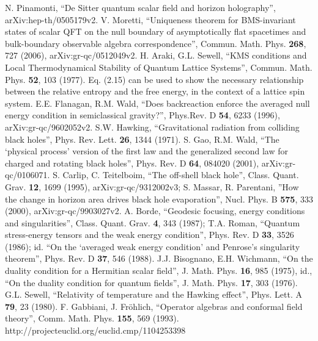 \documentclass{article}
\begin{document}
\begin{thebibliography}{299}
N. Pinamonti, ``De Sitter quantum scalar field and horizon holography'', arXiv:hep-th/0505179v2.
V. Moretti, ``Uniqueness theorem for BMS-invariant states of scalar QFT on the null boundary of asymptotically flat spacetimes and bulk-boundary observable algebra correspondence'', Commun. Math. Phys. \textbf{268}, 727 (2006), arXiv:gr-qc/0512049v2.
H. Araki, G.L. Sewell, ``KMS conditions and Local Thermodynamical Stability of Quantum Lattice Systems'', Commun. Math. Phys. \textbf{52}, 103 (1977).  Eq. (2.15) can be used to show the necessary relationship between the relative entropy and the free energy, in the context of a lattice spin system.
E.E. Flanagan, R.M. Wald, ``Does backreaction enforce the averaged null energy condition in semiclassical gravity?'', Phys.Rev. D \textbf{54}, 6233 (1996), arXiv:gr-qc/9602052v2.
S.W. Hawking, ``Gravitational radiation from colliding black holes'', Phys. Rev. Lett. \textbf{26}, 1344 (1971).
S. Gao, R.M. Wald, ``The `physical process' version of the first law and the generalized second law for charged and rotating black holes'', Phys. Rev. D \textbf{64}, 084020 (2001), arXiv:gr-qc/0106071.
S. Carlip, C. Teitelboim, ``The off-shell black hole'', Class. Quant. Grav. \textbf{12}, 1699 (1995), arXiv:gr-qc/9312002v3; S. Massar, R. Parentani, ''How the change in horizon area drives black hole evaporation'', Nucl. Phys. B \textbf{575}, 333 (2000), arXiv:gr-qc/9903027v2.
A. Borde, ``Geodesic focusing, energy conditions and singularities'', Class. Quant. Grav. \textbf{4}, 343 (1987); T.A. Roman, ``Quantum stress-energy tensors and the weak energy condition'', Phys. Rev. D \textbf{33}, 3526 (1986); id. ``On the `averaged weak energy condition' and Penrose's singularity theorem'', Phys. Rev. D \textbf{37}, 546 (1988).
J.J. Bisognano, E.H. Wichmann, ``On the duality condition for a Hermitian scalar field'', J. Math. Phys. \textbf{16}, 985 (1975), id., ``On the duality condition for quantum fields'', J. Math. Phys. \textbf{17}, 303 (1976).
G.L. Sewell, ``Relativity of temperature and the Hawking effect'', Phys. Lett. A \textbf{79}, 23 (1980).
F. Gabbiani, J. Fr\"{o}hlich, ``Operator algebras and conformal field theory'', Comm. Math. Phys. \textbf{155}, 569 (1993). http://projecteuclid.org/euclid.cmp/1104253398

\end{thebibliography}
\end{document}
